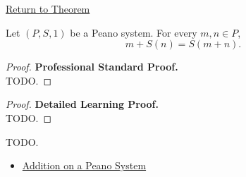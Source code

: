 \newpage
{}
\label{prf:addition-successor-on-right}

\begin{remark*}[Return]
\hyperref[thm:addition-successor-on-right]{Return to Theorem}
\end{remark*}

\begin{theorem*}
Let $(P,S,1)$ be a Peano system. For every $m,n \in P$,
\[
m+S(n)=S(m+n).
\]
\end{theorem*}

\begin{proof}
\textbf{Professional Standard Proof.}~\\
TODO.
\end{proof}

\begin{proof}
\textbf{Detailed Learning Proof.}~\\
TODO.
\end{proof}

\begin{remark*}
TODO.
\end{remark*}

\begin{dependencies}
\begin{itemize}
  \item \hyperref[def:addition-on-peano-system]{Addition on a Peano System}
\end{itemize}
\end{dependencies}
